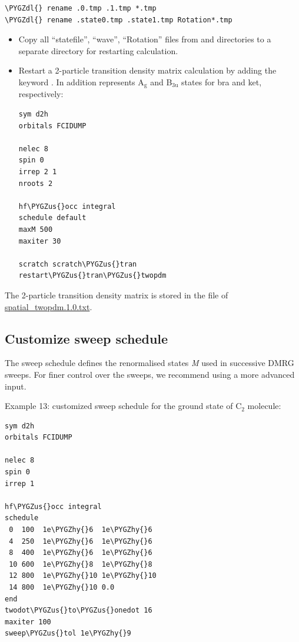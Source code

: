 \documentclass[letterpaper,10pt,english]{sphinxmanual}
\def\PYGZus{\char`\_}
\def\PYGZdl{\char`\$}
\def\PYGZhy{\char`\-}
\begin{document}
\begin{Verbatim}[commandchars=\\\{\}]
\PYGZdl{} rename .0.tmp .1.tmp *.tmp
\PYGZdl{} rename .state0.tmp .state1.tmp Rotation*.tmp
\end{Verbatim}
\begin{itemize}
\item {} 
Copy all ``statefile'', ``wave'', ``Rotation''  files from  and  directories to a separate directory  for restarting calculation.

\item {} 
Restart a 2-particle transition density matrix calculation by adding the keyword . In addition  represents A$_{\text{g}}$ and B$_{\text{3u}}$ states for bra and ket, respectively:

\begin{Verbatim}[commandchars=\\\{\}]
sym d2h
orbitals FCIDUMP

nelec 8
spin 0
irrep 2 1
nroots 2

hf\PYGZus{}occ integral
schedule default
maxM 500
maxiter 30

scratch scratch\PYGZus{}tran
restart\PYGZus{}tran\PYGZus{}twopdm
\end{Verbatim}

\end{itemize}

The 2-particle transition density matrix is stored in the file of
\href{https://raw.githubusercontent.com/sanshar/Block/master/README\_Examples/12/spatial\_twopdm.1.0.txt}{spatial\_twopdm.1.0.txt}.


\subsection{Customize sweep schedule}
\label{examples:customize-sweep-schedule}
The sweep schedule defines the renormalised states \emph{M} used in successive DMRG sweeps.
For finer control over the sweeps, we recommend using a more advanced input.

Example 13: customized sweep schedule for the ground state of C$_{\text{2}}$ molecule:

\begin{Verbatim}[commandchars=\\\{\}]
sym d2h
orbitals FCIDUMP

nelec 8
spin 0
irrep 1

hf\PYGZus{}occ integral
schedule
 0  100  1e\PYGZhy{}6  1e\PYGZhy{}6
 4  250  1e\PYGZhy{}6  1e\PYGZhy{}6
 8  400  1e\PYGZhy{}6  1e\PYGZhy{}6
 10 600  1e\PYGZhy{}8  1e\PYGZhy{}8
 12 800  1e\PYGZhy{}10 1e\PYGZhy{}10
 14 800  1e\PYGZhy{}10 0.0
end
twodot\PYGZus{}to\PYGZus{}onedot 16
maxiter 100
sweep\PYGZus{}tol 1e\PYGZhy{}9
\end{Verbatim}
\end{document}
